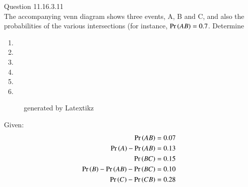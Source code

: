 \documentclass[journal,11pt,onecolumn]{IEEEtran}
\begin{document}
\vspace{3cm}
Question 11.16.3.11\\
The accompanying venn diagram shows three events, A, B and C, and also the probabilities of the various intersections (for instance, $\Pr\left(AB\right)=0.7$. Determine 
\begin{enumerate}
	\item {}
	\item {}
	\item {}
	\item {}
	\item {}
	\item {}
\end{enumerate}
\begin{figure}[h!]
	\centering
	
	\caption {generated by Latextikz}
	\label{fig:probdistri}
\end{figure}
\solution
Given:
\begin{align}
\Pr\left(AB\right)=0.07\\
\Pr\left(A\right)-\Pr\left(AB\right)=0.13\\
\Pr\left(BC\right)=0.15\\
\Pr\left(B\right)-\Pr\left(AB\right)-\Pr\left(BC\right)=0.10\\
\Pr\left(C\right)-\Pr\left(CB\right)=0.28
\end{align}
\end{document}
